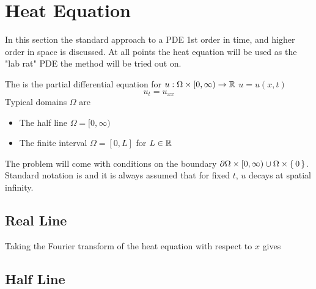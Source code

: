 \documentclass{article}
\begin{document}
\section{Heat Equation}
In this section the standard approach to a PDE 1st order in time, and higher order in space is discussed. At all points the heat equation will be used as the "lab rat" PDE the method will be tried out on. \\
\begin{definition}
The  is the partial differential equation for $u:\Omega \times [0,\infty) \to \mathbb{R}$ $u=u(x,t)$
\[
u_t = u_{xx}
\]
Typical domains $\Omega$ are 
\begin{itemize}
    \item The half line $\Omega = [0,\infty)$
    \item The  finite interval $\Omega = [0,L]$ for $L\in\mathbb{R}$
\end{itemize}
The problem will come with conditions on the boundary $\partial \Omega \times [0,\infty) \cup \Omega\times \set{0}$. Standard notation is 
and it is always assumed that for fixed $t$, $u$ decays at spatial infinity.
\end{definition}

\subsection{Real Line}
Taking the Fourier transform of the heat equation with respect to $x$ gives 

\subsection{Half Line}
\end{document}
